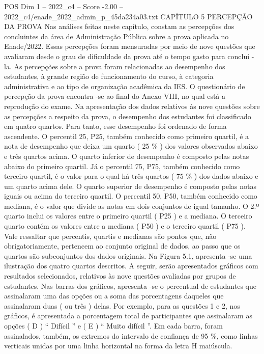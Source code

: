 \begin{textsample}{POS Dim 1 – 2022\_c4 – Score -2.00 – 2022\_c4/enade\_2022\_admin\_p\_45da234a03.txt}  \label{ex:f1_pos_251}
CAPÍTULO 5 PERCEPÇÃO DA PROVA Nas análises feitas neste capítulo, constam as percepções dos concluintes da área de Administração Pública sobre a prova aplicada no Enade/2022.
Essas percepções foram mensuradas por meio de nove questões que avaliaram desde o grau de dificuldade da prova até o tempo gasto para concluí -la.
As percepções sobre a prova foram relacionadas ao desempenho dos estudantes, à grande região de funcionamento do curso, à categoria administrativa e ao tipo de organização acadêmica da IES.
O questionário de percepção da prova encontra -se ao final do Anexo VIII, no qual está a reprodução do exame.
Na apresentação dos dados relativos às nove questões sobre as percepções a respeito da prova, o desempenho dos estudantes foi classificado em quatro quartos.
Para tanto, esse desempenho foi ordenado de forma ascendente.
O percentil 25, P25, também conhecido como primeiro quartil, é a nota de desempenho que deixa um quarto ( 25 \% ) dos valores observados abaixo e três quartos acima.
O quarto inferior de desempenho é composto pelas notas abaixo do primeiro quartil.
Já o percentil 75, P75, também conhecido como terceiro quartil, é o valor para o qual há três quartos ( 75 \% ) dos dados abaixo e um quarto acima dele.
O quarto superior de desempenho é composto pelas notas iguais ou acima do terceiro quartil.
O percentil 50, P50, também conhecido como mediana, é o valor que divide as notas em dois conjuntos de igual tamanho.
O 2.º quarto inclui os valores entre o primeiro quartil ( P25 ) e a mediana.
O terceiro quarto contém os valores entre a mediana ( P50 ) e o terceiro quartil ( P75 ).
Vale ressaltar que percentis, quartis e medianas são pontos que, não obrigatoriamente, pertencem ao conjunto original de dados, ao passo que os quartos são subconjuntos dos dados originais.
Na Figura 5.1, apresenta -se uma ilustração dos quatro quartos descritos.
A seguir, serão apresentados gráficos com resultados selecionados, relativos às nove questões avaliadas por grupos de estudantes.
Nas barras dos gráficos, apresenta -se o percentual de estudantes que assinalaram uma das opções ou a soma das porcentagens daqueles que assinalaram duas ( ou três ) delas.
Por exemplo, para as questões 1 e 2, nos gráficos, é apresentada a porcentagem total de participantes que assinalaram as opções ( D ) “ Difícil ” e ( E ) “ Muito difícil ”.
Em cada barra, foram assinalados, também, os extremos do intervalo de confiança de 95 \%, como linhas verticais unidas por uma linha horizontal na forma da letra H maiúscula.

\end{textsample}

